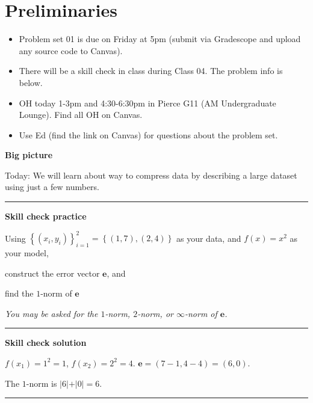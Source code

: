\documentclass[12pt,letterpaper,noanswers]{exam}
\newcommand{\vc}[1]{\boldsymbol{#1}}
\begin{document}
 \pdfpageheight 11in 
  \pdfpagewidth 8.5in

\noindent 



\section{Preliminaries}
\begin{itemize}
\itemsep0pt
\item Problem set 01 is due on Friday at 5pm (submit via Gradescope and upload any source code to Canvas).
\item There will be a skill check in class during Class 04.  The problem info is below.
\item OH today 1-3pm and 4:30-6:30pm in Pierce G11 (AM Undergraduate Lounge).  Find all OH on Canvas.
\item Use Ed (find the link on Canvas) for questions about the problem set.
\end{itemize}



\noindent\textbf{Big picture}

Today: We will learn about way to compress data by describing a large dataset using just a few numbers.

\vspace{0.2cm}
\hrule
\vspace{0.2cm}

\noindent \textbf{Skill check practice}

Using $\left\{(x_i,y_i)\right\}_{i=1}^2 = \left\{(1,7), (2,4)\right\}$ as your data, and $f(x) = x^2$ as your model, 
\begin{parts}
\item construct the error vector $\vc{e}$, and
\item find the $1$-norm of $\vc{e}$
\end{parts}

\emph{You may be asked for the $1$-norm, $2$-norm, or $\infty$-norm of $\vc{e}$.}



\vspace{0.2cm}
\hrule
\vspace{0.2cm}

\noindent \textbf{Skill check solution}

$f(x_1) = 1^2 = 1$, $f(x_2) = 2^2 = 4$.  $\vc{e} = (7-1, 4-4) = (6,0)$.

The $1$-norm is $\vert 6\vert + \vert 0 \vert = 6.$
\vspace{0.2cm}
\hrule
\vspace{0.2cm}
\end{document}
